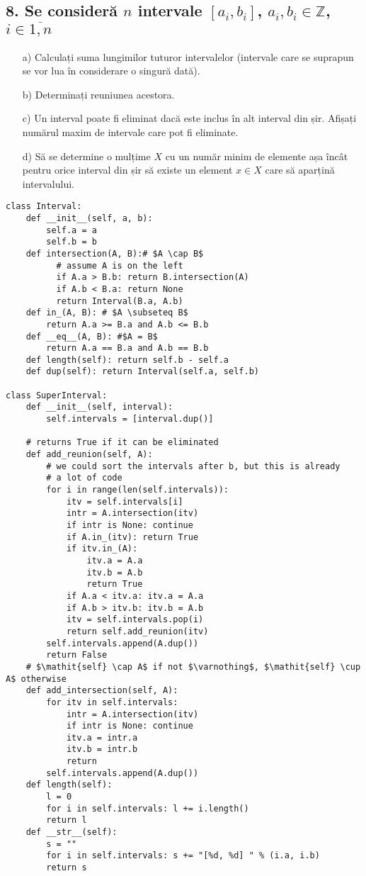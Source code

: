 \documentclass[11pt]{article}
\begin{document}
\begin{itemize}
\begin{itemize}
\pagebreak
\subsection*{8. Se consideră \(n\) intervale \([a_i,b_i]\), \(a_i, b_i \in \mathbb{Z}\), \(i \in \overline{1,n}\)}
\label{sec:orgfecabc3}
\begin{enumerate}
\item[a)] Calculați suma lungimilor tuturor intervalelor (intervale care se suprapun se vor lua în considerare o singură dată).
\item[b)] Determinați reuniunea acestora.
\item[c)] Un interval poate fi eliminat dacă este inclus în alt interval din șir. Afișați numărul maxim de intervale care pot fi eliminate.
\item[d)] Să se determine o mulțime $X$ cu un număr minim de elemente așa încât pentru orice interval din șir să existe un element $x \in X$ care să aparțină intervalului.
\end{enumerate}
\begin{verbatim}
class Interval:
    def __init__(self, a, b):
        self.a = a
        self.b = b
    def intersection(A, B):# $A \cap B$
          # assume A is on the left
          if A.a > B.b: return B.intersection(A)
          if A.b < B.a: return None
          return Interval(B.a, A.b)
    def in_(A, B): # $A \subseteq B$
        return A.a >= B.a and A.b <= B.b
    def __eq__(A, B): #$A = B$
        return A.a == B.a and A.b == B.b
    def length(self): return self.b - self.a
    def dup(self): return Interval(self.a, self.b)

class SuperInterval:
    def __init__(self, interval):
        self.intervals = [interval.dup()]

    # returns True if it can be eliminated
    def add_reunion(self, A):
        # we could sort the intervals after b, but this is already
        # a lot of code
        for i in range(len(self.intervals)):
            itv = self.intervals[i]
            intr = A.intersection(itv)
            if intr is None: continue
            if A.in_(itv): return True
            if itv.in_(A):
                itv.a = A.a
                itv.b = A.b
                return True
            if A.a < itv.a: itv.a = A.a
            if A.b > itv.b: itv.b = A.b
            itv = self.intervals.pop(i)
            return self.add_reunion(itv)
        self.intervals.append(A.dup())
        return False
    # $\mathit{self} \cap A$ if not $\varnothing$, $\mathit{self} \cup A$ otherwise
    def add_intersection(self, A):
        for itv in self.intervals:
            intr = A.intersection(itv)
            if intr is None: continue
            itv.a = intr.a
            itv.b = intr.b
            return
        self.intervals.append(A.dup())
    def length(self):
        l = 0
        for i in self.intervals: l += i.length()
        return l
    def __str__(self):
        s = ""
        for i in self.intervals: s += "[%d, %d] " % (i.a, i.b)
        return s


\end{verbatim}
\end{itemize}
\end{itemize}
\end{document}
